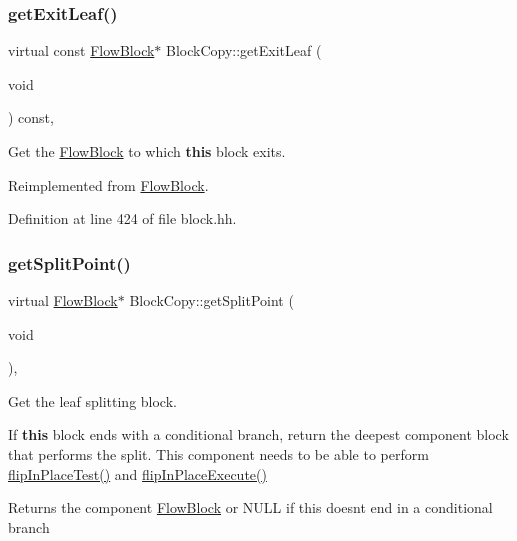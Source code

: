 \subsubsection{\texorpdfstring{getExitLeaf()}{getExitLeaf()}}
{\footnotesize\ttfamily virtual const \mbox{\hyperlink{class_flow_block}{Flow\+Block}}$\ast$ Block\+Copy\+::get\+Exit\+Leaf (\begin{DoxyParamCaption}\item[{void}]{ }\end{DoxyParamCaption}) const\hspace{0.3cm}{\ttfamily [inline]}, {\ttfamily [virtual]}}



Get the \mbox{\hyperlink{class_flow_block}{Flow\+Block}} to which {\bfseries{this}} block exits. 



Reimplemented from \mbox{\hyperlink{class_flow_block_a611bb926194635a0f5cfc0eb16cabe6a}{Flow\+Block}}.



Definition at line 424 of file block.\+hh.

\mbox{\label{class_block_copy_a86c90bb0020298ac2287ff5ab46af8a2}} 
\subsubsection{\texorpdfstring{getSplitPoint()}{getSplitPoint()}}
{\footnotesize\ttfamily virtual \mbox{\hyperlink{class_flow_block}{Flow\+Block}}$\ast$ Block\+Copy\+::get\+Split\+Point (\begin{DoxyParamCaption}\item[{void}]{ }\end{DoxyParamCaption})\hspace{0.3cm}{\ttfamily [inline]}, {\ttfamily [virtual]}}



Get the leaf splitting block. 

If {\bfseries{this}} block ends with a conditional branch, return the deepest component block that performs the split. This component needs to be able to perform \mbox{\hyperlink{class_flow_block_a09019e2e4104844e1a698ccf72560bef}{flip\+In\+Place\+Test()}} and \mbox{\hyperlink{class_flow_block_a263ec50d30f807a8e1286ac37c6728ce}{flip\+In\+Place\+Execute()}} \begin{DoxyReturn}{Returns}
the component \mbox{\hyperlink{class_flow_block}{Flow\+Block}} or N\+U\+LL if this doesn\textquotesingle{}t end in a conditional branch 
\end{DoxyReturn}


